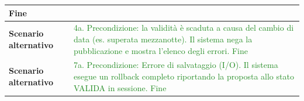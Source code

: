 \documentclass[12pt, a4paper, oneside]{report}
\begin{document}
\begin{tabularx}{\textwidth}{|l|X|}
    Fine \\ \hline
    \textbf{Scenario alternativo} & 
    \textcolor{ForestGreen}{4a. Precondizione: la validità è scaduta a causa del cambio di data (es. superata mezzanotte).}\newline
    \textcolor{ForestGreen}{Il sistema nega la pubblicazione e mostra l'elenco degli errori.}\newline
    \textcolor{ForestGreen}{Fine} \\ \hline
    \textbf{Scenario alternativo} & 
    \textcolor{ForestGreen}{7a. Precondizione: Errore di salvataggio (I/O).}\newline
    \textcolor{ForestGreen}{Il sistema esegue un rollback completo riportando la proposta allo stato VALIDA in sessione.}\newline
    \textcolor{ForestGreen}{Fine} \\ \hline
\end{tabularx}

\renewcommand{\arraystretch}{1.4} 
\end{document}
